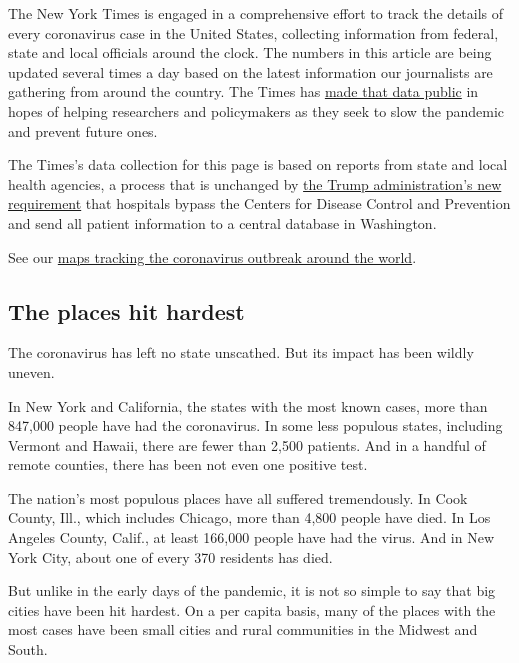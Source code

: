 The New York Times is engaged in a comprehensive effort to track the
details of every coronavirus case in the United States, collecting
information from federal, state and local officials around the clock.
The numbers in this article are being updated several times a day based
on the latest information our journalists are gathering from around the
country. The Times has
\href{https://www.nytimes3xbfgragh.onion/article/coronavirus-county-data-us.html?action=click\&module=Spotlight\&pgtype=Homepage}{made
that data public} in hopes of helping researchers and policymakers as
they seek to slow the pandemic and prevent future ones.

The Times's data collection for this page is based on reports from state
and local health agencies, a process that is unchanged by
\href{https://www.nytimes3xbfgragh.onion/2020/07/14/us/politics/trump-cdc-coronavirus.html}{the
Trump administration's new requirement} that hospitals bypass the
Centers for Disease Control and Prevention and send all patient
information to a central database in Washington.

See our
\href{https://www.nytimes3xbfgragh.onion/interactive/2020/world/coronavirus-maps.html}{maps
tracking the coronavirus outbreak around the world}.

\hypertarget{the-places-hit-hardest}{%
\subsection{The places hit hardest}\label{the-places-hit-hardest}}

The coronavirus has left no state unscathed. But its impact has been
wildly uneven.

In New York and California, the states with the most known cases, more
than 847,000 people have had the coronavirus. In some less populous
states, including Vermont and Hawaii, there are fewer than 2,500
patients. And in a handful of remote counties, there has been not even
one positive test.

The nation's most populous places have all suffered tremendously. In
Cook County, Ill., which includes Chicago, more than 4,800 people have
died. In Los Angeles County, Calif., at least 166,000 people have had
the virus. And in New York City, about one of every 370 residents has
died.

But unlike in the early days of the pandemic, it is not so simple to say
that big cities have been hit hardest. On a per capita basis, many of
the places with the most cases have been small cities and rural
communities in the Midwest and South.

